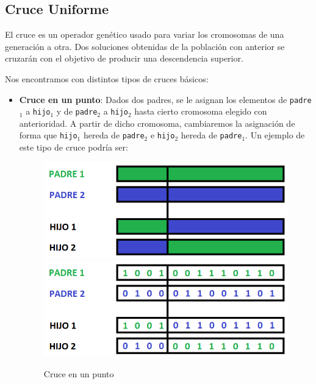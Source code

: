 \subsection{Cruce Uniforme}

El cruce es un operador genético usado para variar los cromosomas de una generación a otra. 
Dos soluciones obtenidas de la población con anterior se cruzarán con el objetivo de producir una descendencia superior. 

Nos encontramos con distintos tipos de cruces básicos:
\begin{itemize}
	\item \textbf{Cruce en un punto}:  Dados dos padres, se le asignan los elementos de \texttt{padre$_1$} a \texttt{hijo$_1$} y de \texttt{padre$_2$} a \texttt{hijo$_2$} hasta cierto cromosoma elegido con anterioridad. 
A partir de dicho cromosoma, cambiaremos la asignación de forma que \texttt{hijo$_1$} hereda de \texttt{padre$_2$} e \texttt{hijo$_2$} hereda de \texttt{padre$_1$}. 
Un ejemplo de este tipo de cruce podría ser:

\begin{figure}[H]
		\centering
		\includegraphics[scale=0.5]{imagenes/Crossover1point.png}
		\includegraphics[scale=0.5]{imagenes/Crossover1pointNumber.png}
        \caption{Cruce en un punto}
        \label{fig:Crossover1}
\end{figure}


\end{itemize}
